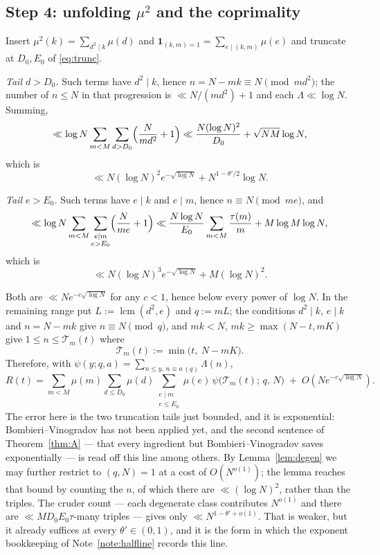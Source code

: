 \documentclass[11pt,a4paper]{article}
\theoremstyle{plain}
\theoremstyle{definition}
\theoremstyle{remark}
\newcommand{\Tcut}{\mathcal T}
\DeclareMathOperator{\lcm}{lcm}
\begin{document}
\subsection{Step 4: unfolding \texorpdfstring{$\mu^2$}{mu-squared} and the
coprimality}

Insert $\mu^2(k)=\sum_{d^2\mid k}\mu(d)$ and
$\mathbf 1_{(k,m)=1}=\sum_{e\mid(k,m)}\mu(e)$ and truncate at
$D_0,E_0$ of \eqref{eq:trunc}.

\emph{Tail $d>D_0$.} Such terms have $d^2\mid k$, hence
$n=N-mk\equiv N\pmod{md^2}$; the number of $n\le N$ in that
progression is $\ll N/(md^2)+1$ and each $\Lambda\ll\log N$. Summing,
\[
  \ll\log N\sum_{m<M}\sum_{d>D_0}\Bigl(\frac{N}{md^2}+1\Bigr)
  \ll\frac{N(\log N)^2}{D_0}+\sqrt{NM}\log N,
\]
which is
\[
  \ll N(\log N)^2e^{-\sqrt{\log N}}+N^{1-\theta'/2}\log N.
\]

\emph{Tail $e>E_0$.} Such terms have $e\mid k$ and $e\mid m$, hence
$n\equiv N\pmod{me}$, and
\[
  \ll\log N\sum_{m<M}\sum_{\substack{e\mid m\\ e>E_0}}
      \Bigl(\frac{N}{me}+1\Bigr)
  \ll\frac{N\log N}{E_0}\sum_{m<M}\frac{\tau(m)}{m}+M\log M\log N,
\]
which is
\[
  \ll N(\log N)^{3}e^{-\sqrt{\log N}}+M(\log N)^2 .
\]

Both are $\ll Ne^{-c\sqrt{\log N}}$ for any $c<1$, hence below every
power of $\log N$. In the remaining range put
$L:=\lcm(d^2,e)$ and $q:=mL$; the conditions $d^2\mid k$, $e\mid k$
and $n=N-mk$ give $n\equiv N\pmod q$, and $mk<N$,
$mk\ge\max(N-t,mK)$ give $1\le n\le\Tcut_m(t)$ where
\begin{equation}\label{eq:Tm}
  \Tcut_m(t):=\min\bigl(t,\ N-mK\bigr).
\end{equation}
Therefore, with $\psi(y;q,a)=\sum_{n\le y,\,n\equiv a\,(q)}\Lambda(n)$,
\begin{equation}\label{eq:R2}
  R(t)=\sum_{m<M}\mu(m)\sum_{d\le D_0}\mu(d)
         \sum_{\substack{e\mid m\\ e\le E_0}}\mu(e)\,
         \psi\bigl(\Tcut_m(t);\,q,\,N\bigr)
         \;+\;O\!\left(Ne^{-c\sqrt{\log N}}\right).
\end{equation}
The error here is the two truncation tails just bounded, and it is
exponential: Bombieri--Vinogradov has not been applied yet, and the
second sentence of Theorem~\ref{thm:A} --- that every ingredient but
Bombieri--Vinogradov saves exponentially --- is read off this line
among others.
By Lemma~\ref{lem:degen} we may further restrict to $(q,N)=1$ at a cost
of $O(N^{o(1)})$; the lemma reaches that bound by counting the $n$, of
which there are $\ll(\log N)^2$, rather than the triples. The cruder
count --- each degenerate class contributes $N^{o(1)}$ and there are
$\ll MD_0E_0\tau$-many triples --- gives only $\ll N^{1-\theta'+o(1)}$.
That is weaker, but it already suffices at every $\theta'\in(0,1)$, and
it is the form in which the exponent bookkeeping of
Note~\ref{note:halfline} records this line.
\end{document}
